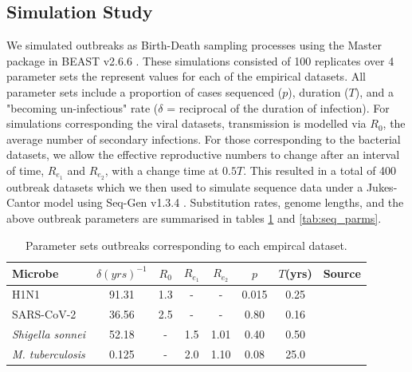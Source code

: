 \documentclass{article}
\begin{document}
\begin{spacing}{1.5}
\subsection*{Simulation Study}
We simulated outbreaks as Birth-Death sampling processes using the Master package in BEAST v2.6.6 \citep{vaughan_stochastic_2013,bouckaert_beast_2019}. These simulations consisted of 100 replicates over 4 parameter sets the represent values for each of the empirical datasets. All parameter sets include a proportion of cases sequenced ($p$), duration ($T$), and a "becoming un-infectious" rate ($\delta$ = reciprocal of the duration of infection). For simulations corresponding the viral datasets, transmission is modelled via $R_0$, the average number of secondary infections. For those corresponding to the bacterial datasets, we allow the effective reproductive numbers to change after an interval of time, $R_{e_1}$ and $R_{e_2}$, with a change time at $0.5T$. This resulted in a total of 400 outbreak datasets which we then used to simulate sequence data under a Jukes-Cantor model using Seq-Gen v1.3.4 \citep{rambaut_seq-gen_1997}. Substitution rates, genome lengths, and the above outbreak parameters are summarised in tables \ref{tab:sim_parms} and \ref{tab:seq_parms}.

\begin{table}[ht]
    \centering
    \caption{Parameter sets outbreaks corresponding to each empircal dataset.}
    \begin{tabular}{l|c|c|c|c|c|c|l|}
    \hline
    Microbe                     &   $\delta (yrs)^{-1}$    & $R_0$ &   $R_{e_1}$   &  $R_{e_2}$    &   $p$   &   $T$(yrs)   & Source \\
    \hline
    H1N1                        &   91.31    & 1.3 &   -   &  -    &   0.015   &   0.25 & \citet{hedge_2013_real-time} \\
    SARS-CoV-2                  &   36.56    & 2.5 &   -   &  -   &   0.80   &  0.16 & \citet{lane2021genomics} \\
    \textit{Shigella sonnei}    &   52.18    &  - &   1.5   &  1.01   &   0.40   &   0.50 & \citet{ingle_co-circulation_2019} \\
    \textit{M. tuberculosis}    &   0.125    &  - &   2.0   &  1.10    &   0.08   &   25.0 & \citet{kuhnert_tuberculosis_2018} \\
    \hline
    \end{tabular}
    \label{tab:sim_parms}
\end{table}


\end{spacing}
\end{document}
